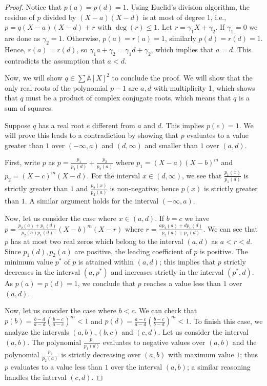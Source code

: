 \documentclass[10pt,a4paper]{amsart}
\newcommand{\aX}{\mathbb{A}[X]}
\begin{document}
\begin{proof}
  Notice that $p(a) = p(d) = 1$. Using Euclid's division algorithm, the residue
  of $p$ divided by $(X-a)(X-d)$ is at most of degree 1, i.e.,
  $p = q(X-a)(X-d) + r$ with $\deg(r) \leq 1$. Let $r = \gamma_1 X +
  \gamma_2$. If $\gamma_1 = 0$ we are done as $\gamma_2 = 1$. Otherwise,
  $p(a) = r(a) = 1$, similarly $p(d) = r(d) = 1$. Hence, $r(a) = r(d)$, so
  $\gamma_1 a + \gamma_2 = \gamma_1 d + \gamma_2$, which implies that $a =
  d$. This contradicts the assumption that $a < d$.

  Now, we will show $q \in \sum{\aX}^2$ to conclude the proof. We will
  show that the only real roots of the polynomial $p - 1$ are $a, d$
  with multiplicity 1, which shows that $q$ must be a product of complex
  conjugate roots, which means that $q$ is a sum of squares.

  Suppose $q$ has a real root $e$ different from $a$ and $d$. This implies
 $p(e) = 1$. We will prove this leads to a contradiction by showing that $p$
  evaluates to a value greater than $1$ over $(-\infty, a)$ and $(d, \infty)$
  and smaller than $1$ over $(a, d)$.

  First, write $p$ as $p = \frac{p_1}{p_1(d)} + \frac{p_2}{p_2(a)}$ where
  $p_1 = (X-a)(X-b)^{m}$ and $p_2 = (X-c)^m(X-d)$. For the interval $x \in (d,
  \infty)$, we see that $\frac{p_1(x)}{p_1(d)}$ is strictly greater than $1$ and
  $\frac{p_2(x)}{p_2(a)}$ is non-negative; hence $p(x)$ is strictly greater than
  $1$. A similar argument holds for the interval $(-\infty, a)$.

  Now, let us consider the case where $x \in (a, d)$. If $b = c$ we have
 $p = \frac{p_2(a) + p_1(d)}{p_2(a) p_1(d)}(X-b)^{m}\left(X - r\right)$ where
  $r = \frac{a p_2(a) + d p_1(d)}{p_2(a) + p_1(d)}$. We can see that $p$ has at
  most two real zeros which belong to the interval $(a, d)$ as $a < r <
  d$. Since $p_1(d), p_2(a)$ are positive, the leading coefficient of $p$ is
  positive. The minimum value $p^{*}$ of $p$ is attained within
 $\left(a, d\right)$; this implies that $p$ strictly decreases in the
 interval $(a, p^{*})$ and increases strictly in the interval $(p^{*},
  d)$. As $p(a) = p(d) = 1$, we conclude that $p$ reaches a value less than
  $1$ over $(a, d)$.

  Now, let us consider the case where $b < c$. We can check that
  $p(b) = \frac{b-d}{a-d} (\frac{b-c}{a-c})^{m} < 1$ and
  $p(d) = \frac{a-c}{a-d} (\frac{b-c}{b-d})^{m} < 1$. To finish this case, we
  analyze the intervals $(a, b), (b, c)$ and $(c, d)$. Let us consider the
  interval $(a, b)$. The polynomial $\frac{p_1}{p_1(d)}$ evaluates to negative
  values over $(a, b)$ and the polynomial $\frac{p_2}{p_2(a)}$ is strictly
  decreasing over $(a, b)$ with maximum value $1$; thus $p$ evaluates to a value
  less than $1$ over the interval $(a, b)$; a similar reasoning handles the
  interval $(c, d)$.


\end{proof}
\end{document}
